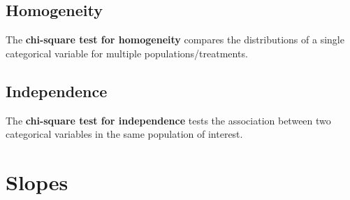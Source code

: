\documentclass[../AP_Statistics.tex]{subfiles}
\begin{document}
		\section{Homogeneity}
			The \textbf{chi-square test for homogeneity} compares the distributions of a single categorical variable for multiple populations/treatments.
		\section{Independence}
			The \textbf{chi-square test for independence} tests the association between two categorical variables in the same population of interest.

	\chapter{Slopes}
\end{document}
